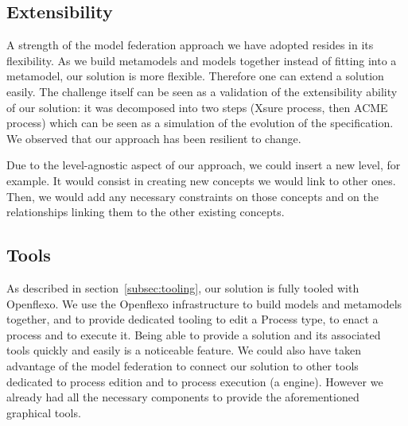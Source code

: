   \subsection{Extensibility}


  A strength of the  model federation approach we have adopted resides in its
  flexibility. As we build metamodels and models together instead of fitting
  into a metamodel, our solution is more flexible. Therefore one can extend a
  solution easily. The challenge itself can be seen as a validation of the
  extensibility ability of our solution: it was decomposed into two steps
  (Xsure process, then ACME process) which can be seen as a simulation of the
  evolution of the  specification. We observed that our approach has been
  resilient to change.

  Due to the level-agnostic aspect of our approach, we could insert a new
  level, for example. It would consist in creating new concepts we would link
  to other ones. Then, we would add any necessary constraints on those concepts
  and on the relationships linking them to the other existing concepts. 


  
\subsection{Tools}


As described in section~\ref{subsec:tooling}, our solution is fully tooled with
Openflexo.  We use the Openflexo infrastructure to build models and metamodels
together, and to provide dedicated tooling to edit a Process type, to enact a
process and to execute it. Being able to provide a solution and its associated
tools quickly and easily is a noticeable feature.  We could also have taken
advantage of the model federation to connect our solution to other tools
dedicated to process edition and to process execution (\eg a \BPMN engine).
However we already had all the necessary components to provide the
aforementioned graphical tools.

